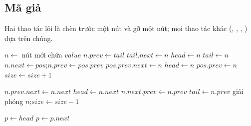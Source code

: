 \subsection{Mã giả}
Hai thao tác lõi là chèn trước một nút và gỡ một nút; mọi thao tác khác (, , , ) dựa trên chúng.

\begin{algorithm}[H]
\caption{\textsc{LinkBefore}$(pos, value)$: chèn trước nút $pos$ ($pos=\text{null}$: chèn cuối)}
\begin{algorithmic}[1]
\State $n \gets$ nút mới chứa $value$
  \State $n.prev \gets tail$
   \State $tail.next \gets n$ \Else \State $head \gets n$ \EndIf
  \State $tail \gets n$
\Else
  \State $n.next \gets pos$;\quad $n.prev \gets pos.prev$
   \State $pos.prev.next \gets n$ \Else \State $head \gets n$ \EndIf
  \State $pos.prev \gets n$
\EndIf
\State $size \gets size + 1$
\end{algorithmic}
\end{algorithm}

\begin{algorithm}[H]
\caption{\textsc{Unlink}$(n)$: gỡ và giải phóng nút $n$}
\begin{algorithmic}[1]
 \State $n.prev.next \gets n.next$ \Else \State $head \gets n.next$ \EndIf
{} \State $n.next.prev \gets n.prev$ \Else \State $tail \gets n.prev$ \EndIf
\State giải phóng $n$;\quad $size \gets size - 1$
\end{algorithmic}
\end{algorithm}

\begin{algorithm}[H]
\caption{\textsc{InsertSorted}$(value, less)$: chèn giữ thứ tự tăng, ổn định}
\begin{algorithmic}[1]
\State $p \gets head$
  \State $p \gets p.next$
\EndWhile
\State {}
\end{algorithmic}
\end{algorithm}

